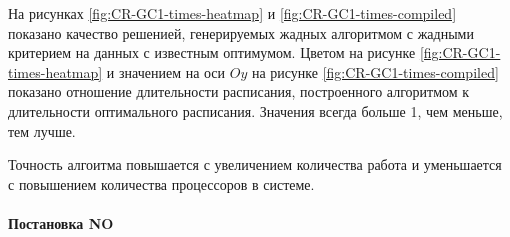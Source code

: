 На рисунках \ref{fig:CR-GC1-times-heatmap} и \ref{fig:CR-GC1-times-compiled} показано качество решенией, генерируемых жадных алгоритмом с жадными критерием на данных с известным оптимумом. Цветом на рисунке \ref{fig:CR-GC1-times-heatmap} и значением на оси $Oy$ на рисунке \ref{fig:CR-GC1-times-compiled} показано отношение длительности расписания, построенного алгоритмом к длительности оптимального расписания. Значения всегда больше 1, чем меньше, тем лучше.

Точность алгоитма повышается с увеличением количества работа и уменьшается с повышением количества процессоров в системе. 




\paragraph{Постановка NO}

